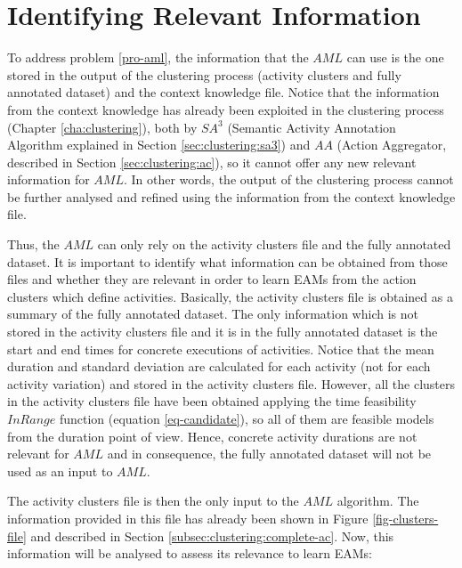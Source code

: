\section{Identifying Relevant Information}
\label{sec:learner:relevant}


To address problem \ref{pro-aml}, the information that the $AML$ can use is the one stored in the output of the clustering process (activity clusters and fully annotated dataset) and the context knowledge file. Notice that the information from the context knowledge has already been exploited in the clustering process (Chapter \ref{cha:clustering}), both by $SA^3$ (Semantic Activity Annotation Algorithm explained in Section \ref{sec:clustering:sa3}) and $AA$ (Action Aggregator, described in Section \ref{sec:clustering:ac}), so it cannot offer any new relevant information for $AML$. In other words, the output of the clustering process cannot be further analysed and refined using the information from the context knowledge file.

Thus, the $AML$ can only rely on the activity clusters file and the fully annotated dataset. It is important to identify what information can be obtained from those files and whether they are relevant in order to learn EAMs from the action clusters which define activities. Basically, the activity clusters file is obtained as a summary of the fully annotated dataset. The only information which is not stored in the activity clusters file and it is in the fully annotated dataset is the start and end times for concrete executions of activities. Notice that the mean duration and standard deviation are calculated for each activity (not for each activity variation) and stored in the activity clusters file. However, all the clusters in the activity clusters file have been obtained applying the time feasibility $InRange$ function (equation \ref{eq-candidate}), so all of them are feasible models from the duration point of view. Hence, concrete activity durations are not relevant for $AML$ and in consequence, the fully annotated dataset will not be used as an input to $AML$.

The activity clusters file is then the only input to the $AML$ algorithm. The information provided in this file has already been shown in Figure \ref{fig-clusters-file} and described in Section \ref{subsec:clustering:complete-ac}. Now, this information will be analysed to assess its relevance to learn EAMs:

